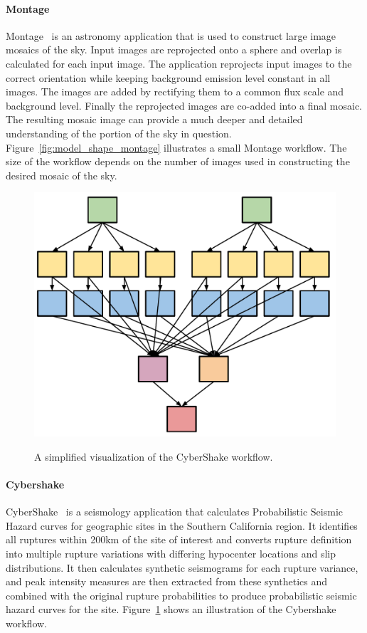 \paragraph{\textbf{Montage}}
Montage~\cite{Berriman2004} is an astronomy application that is used to construct large image mosaics of the sky. Input images are reprojected onto a sphere and overlap is calculated for each input image. The application reprojects input images to the correct orientation while keeping background emission level constant in all images. The images are added by rectifying them to a common flux scale and background level. Finally the reprojected images are co-added into a final mosaic. The resulting mosaic image can provide a much deeper and detailed understanding of the portion of the sky in question. Figure~\ref{fig:model_shape_montage} illustrates a small Montage workflow. The size of the workflow depends on the number of images used in constructing the desired mosaic of the sky. 

\begin{figure}[htb]
	\centering
	\includegraphics[width=0.5\linewidth]{figures/workflowsim/cybershake_shape.pdf} \\
	\caption{A simplified visualization of the CyberShake workflow.}
	\label{fig:model_shape_cybershake}
\end{figure}

\paragraph{\textbf{Cybershake}}
CyberShake~\cite{Graves2010} is a seismology application that calculates Probabilistic Seismic Hazard curves for geographic sites in the Southern California region. It identifies all ruptures within 200km of the site of interest and converts rupture definition into multiple rupture variations with differing hypocenter locations and slip distributions. It then calculates synthetic seismograms for each rupture variance, and peak intensity measures are then extracted from these synthetics and combined with the original rupture probabilities to produce probabilistic seismic hazard curves for the site. Figure~\ref{fig:model_shape_cybershake} shows an illustration of the Cybershake workflow.

